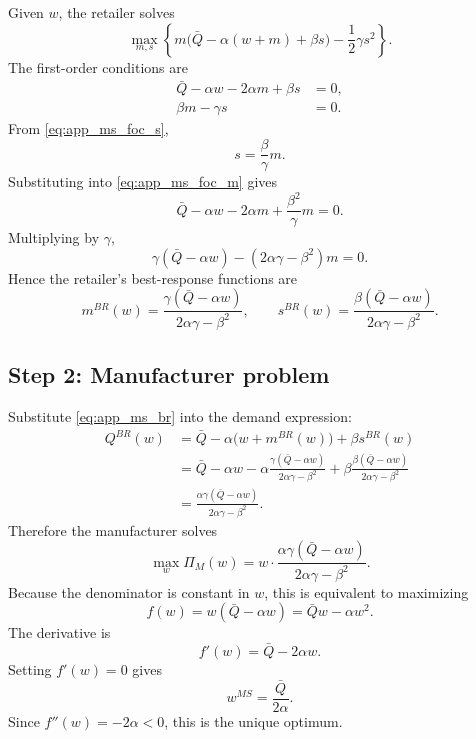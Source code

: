 Given $w$, the retailer solves
\begin{equation}
 \max_{m,s}
 \left\{m\bigl(\bar Q-\alpha(w+m)+\beta s\bigr)-\frac{1}{2}\gamma s^2\right\}.
\end{equation}
The first-order conditions are
\begin{align}
 \bar Q-\alpha w-2\alpha m+\beta s &=0,
 \label{eq:app_ms_foc_m}\\
 \beta m-\gamma s &=0.
 \label{eq:app_ms_foc_s}
\end{align}
From \eqref{eq:app_ms_foc_s},
\begin{equation}
 s=\frac{\beta}{\gamma}m.
 \label{eq:app_ms_s_of_m}
\end{equation}
Substituting into \eqref{eq:app_ms_foc_m} gives
\begin{equation}
 \bar Q-\alpha w-2\alpha m+\frac{\beta^2}{\gamma}m=0.
\end{equation}
Multiplying by $\gamma$,
\begin{equation}
 \gamma(\bar Q-\alpha w)-(2\alpha\gamma-\beta^2)m=0.
\end{equation}
Hence the retailer's best-response functions are
\begin{equation}
 m^{BR}(w)=\frac{\gamma(\bar Q-\alpha w)}{2\alpha\gamma-\beta^2},
 \qquad
 s^{BR}(w)=\frac{\beta(\bar Q-\alpha w)}{2\alpha\gamma-\beta^2}.
 \label{eq:app_ms_br}
\end{equation}

\subsection{Step 2: Manufacturer problem}

Substitute \eqref{eq:app_ms_br} into the demand expression:
\begin{align}
 Q^{BR}(w)
 &= \bar Q-\alpha\bigl(w+m^{BR}(w)\bigr)+\beta s^{BR}(w) \\
 &= \bar Q-\alpha w
 -\alpha\frac{\gamma(\bar Q-\alpha w)}{2\alpha\gamma-\beta^2}
 +\beta\frac{\beta(\bar Q-\alpha w)}{2\alpha\gamma-\beta^2} \\
 &= \frac{\alpha\gamma(\bar Q-\alpha w)}{2\alpha\gamma-\beta^2}.
\end{align}
Therefore the manufacturer solves
\begin{equation}
 \max_w \Pi_M(w)=w\cdot \frac{\alpha\gamma(\bar Q-\alpha w)}{2\alpha\gamma-\beta^2}.
\end{equation}
Because the denominator is constant in $w$, this is equivalent to maximizing
\begin{equation}
 f(w)=w(\bar Q-\alpha w)=\bar Q w-\alpha w^2.
\end{equation}
The derivative is
\begin{equation}
 f'(w)=\bar Q-2\alpha w.
\end{equation}
Setting $f'(w)=0$ gives
\begin{equation}
 w^{MS}=\frac{\bar Q}{2\alpha}.
\end{equation}
Since $f''(w)=-2\alpha<0$, this is the unique optimum.

